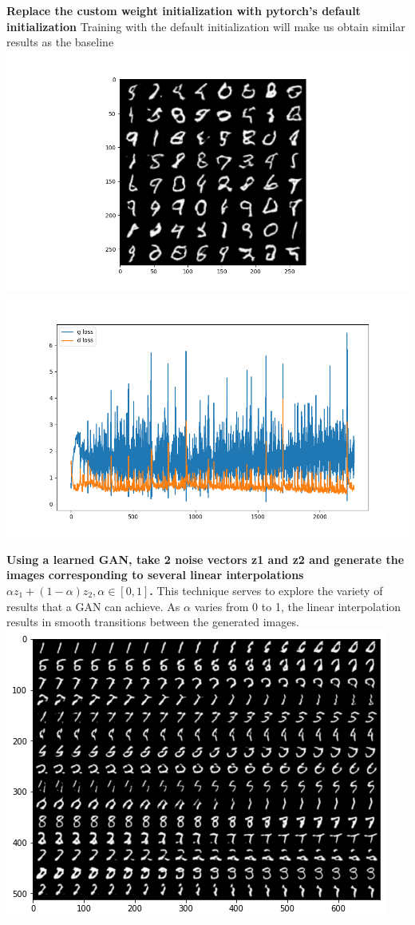 \textbf{Replace the custom weight initialization with pytorch's default
initialization} Training with the default initialization will make us
obtain similar results as the baseline
\includegraphics{./images/Pasted image 20231229115158.png}
\includegraphics{./images/Pasted image 20231229115203.png}

\textbf{Using a learned GAN, take 2 noise vectors z1 and z2 and generate
the images corresponding to several linear interpolations
\(αz_1 + (1 − α)z_2, α ∈ [0, 1]\).} This technique serves to explore the
variety of results that a GAN can achieve. As \(\alpha\) varies from 0
to 1, the linear interpolation results in smooth transitions between the
generated images.
\includegraphics{./images/Pasted image 20231229115339.png}


